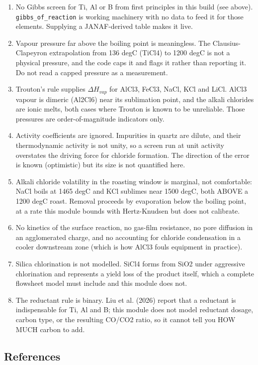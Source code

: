 \documentclass[10pt,a4paper,twoside]{report}
\begin{document}
\begin{enumerate}[leftmargin=*,label=\arabic*.]
\item No Gibbs screen for Ti, Al or B from first principles in this build (see above). \texttt{gibbs\_of\_reaction} is working machinery with no data to feed it for those elements. Supplying a JANAF-derived table makes it live.
\item Vapour pressure far above the boiling point is meaningless. The Clausius-Clapeyron extrapolation from 136 degC (TiCl4) to 1200 degC is not a physical pressure, and the code caps it and flags it rather than reporting it. Do not read a capped pressure as a measurement.
\item Trouton's rule supplies $\Delta H_{vap}$ for AlCl3, FeCl3, NaCl, KCl and LiCl. AlCl3 vapour is dimeric (Al2Cl6) near its sublimation point, and the alkali chlorides are ionic melts, both cases where Trouton is known to be unreliable. Those pressures are order-of-magnitude indicators only.
\item Activity coefficients are ignored. Impurities in quartz are dilute, and their thermodynamic activity is not unity, so a screen run at unit activity overstates the driving force for chloride formation. The direction of the error is known (optimistic) but its size is not quantified here.
\item Alkali chloride volatility in the roasting window is marginal, not comfortable: NaCl boils at 1465 degC and KCl sublimes near 1500 degC, both ABOVE a 1200 degC roast. Removal proceeds by evaporation below the boiling point, at a rate this module bounds with Hertz-Knudsen but does not calibrate.
\item No kinetics of the surface reaction, no gas-film resistance, no pore diffusion in an agglomerated charge, and no accounting for chloride condensation in a cooler downstream zone (which is how AlCl3 fouls equipment in practice).
\item Silica chlorination is not modelled. SiCl4 forms from SiO2 under aggressive chlorination and represents a yield loss of the product itself, which a complete flowsheet model must include and this module does not.
\item The reductant rule is binary. Liu et al. (2026) report that a reductant is indispensable for Ti, Al and B; this module does not model reductant dosage, carbon type, or the resulting CO/CO2 ratio, so it cannot tell you HOW MUCH carbon to add.
\end{enumerate}

\subsection*{References}
\end{document}
